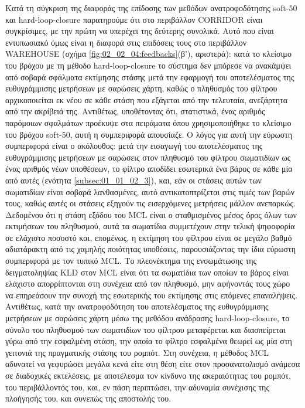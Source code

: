 Κατά τη σύγκριση της διαφοράς της επίδοσης των μεθόδων ανατροφοδότησης
soft-$50$ και hard-loop-closure παρατηρούμε ότι στο περιβάλλον CORRIDOR είναι
συγκρίσιμες, με την πρώτη να υπερέχει της δεύτερης συνολικά. Αυτό που είναι
εντυπωσιακό όμως είναι η διαφορά στις επιδόσεις τους στο περιβάλλον WAREHOUSE
(σχήμα \ref{fig:02_02_04:feedbacks}(β'), αριστερά): κατά το κλείσιμο του βρόχου
με τη μέθοδο hard-loop-closure το σύστημα δεν μπόρεσε να ανακάμψει από σοβαρά
σφάλματα εκτίμησης στάσης μετά την εφαρμογή του αποτελέσματος της ευθυγράμμισης
μετρήσεων με σαρώσεις χάρτη, καθώς ο πληθυσμός του φίλτρου αρχικοποιείται εκ
νέου σε κάθε στάση που εξάγεται από την τελευταία, ανεξάρτητα από την ακρίβειά
της. Αντιθέτως, υποθέτοντας ότι, στατιστικά, ένας αριθμός παρόμοιων σφαλμάτων
προέκυψε στα πειράματα όπου χρησιμοποιήθηκε το κλείσιμο του βρόχου soft-$50$,
αυτή η συμπεριφορά απουσίαζε. Ο λόγος για αυτή την εύρωστη συμπεριφορά είναι
ο ακόλουθος: μετά την εισαγωγή του αποτελέσματος της ευθυγράμμισης μετρήσεων με
σαρώσεις στον πληθυσμό του φίλτρου σωματιδίων ως ένας αριθμός νέων υποθέσεων,
το φίλτρο αποδίδει εσωτερικά ένα βάρος σε κάθε μία από αυτές (ενότητα
\ref{subsec:01_01_02_3}), και, εάν οι στάσεις αυτών των σωματιδίων είναι σοβαρά
λανθασμένες, αυτό αντικατοπτρίζεται στις τιμές των βαρών τους, καθώς αυτές οι
στάσεις εξηγούν τις εισερχόμενες μετρήσεις μάλλον ανεπαρκώς. Δεδομένου ότι η
στάση εξόδου του MCL είναι ο σταθμισμένος μέσος όρος όλων των εκτιμήσεων του
πληθυσμού, αυτά τα σωματίδια συμμετέχουν στην τελική ψηφοφορία σε ελάχιστο
ποσοστό και, επομένως, η εκτίμηση του φίλτρου είναι σε μεγάλο βαθμό αδιατάρακτη
από τις χαμηλής ποιότητας υποθέσεις, παρουσιάζοντας την ίδια εύρωστη
συμπεριφορά με τον τυπικό MCL. Το πλεονέκτημα της ενσωμάτωσης της
δειγματοληψίας KLD στον MCL είναι ότι τα σωματίδια των οποίων το βάρος είναι
ελάχιστο απορρίπτονται στη συνέχεια από τον πληθυσμό, μην αφήνοντάς τους χώρο
να επηρεάσουν την συνοχή της εσωτερικής του εκτίμησης στις επόμενες
επαναλήψεις. Αντιθέτως, κατά την ανατροφοδότηση του αποτελέσματος της
ευθυγράμμισης μετρήσεων με σαρώσεις χάρτη μέσω της μεθόδου ανάδρασης
hard-loop-closure, το σύνολο του πληθυσμού των σωματιδίων του φίλτρου
μεταφέρεται και διασπείρεται γύρω από την εσφαλμένη στάση, την οποία το φίλτρο
εσφαλμένα θεωρεί ως μία στη γειτονιά της πραγματικής στάσης του ρομπότ.  Στη
συνέχεια, η μέθοδος MCL αδυνατεί να γεφυρώσει μεγάλα κενά είτε στη θέση είτε
στον προσανατολισμό ανάμεσα σε διαδοχικές εκτελέσεις, με αποτέλεσμα τον κίνδυνο
της ακεραιότητας του ρομπότ, του περιβάλλοντός του, και, εν πάση περιπτώσει,
την αδυναμία συνέχισης της πλοήγησής του, και συνεπώς της αποστολής του.
